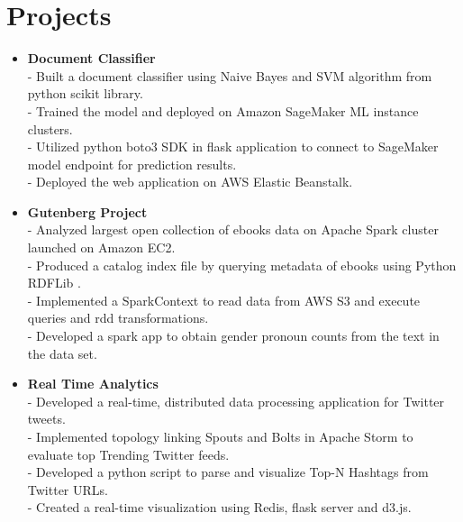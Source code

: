 \section {Projects}
\begin{itemize}



\item \textbf{Document Classifier} \\
 - Built a document classifier using Naive Bayes and SVM algorithm from python scikit library.\\
 - Trained the model and deployed on Amazon SageMaker ML instance clusters.\\
 - Utilized python boto3 SDK in flask application to connect to SageMaker model endpoint for prediction results.\\
 - Deployed the web application on AWS Elastic Beanstalk.

 \item \textbf{Gutenberg Project}\\
 - Analyzed largest open collection of ebooks data on Apache Spark cluster launched on Amazon EC2.\\
 - Produced a catalog index file by querying metadata of ebooks using Python RDFLib .\\
 - Implemented a SparkContext to read data from AWS S3 and execute queries and rdd transformations.\\
 - Developed a spark app to obtain gender pronoun counts from the text in the data set.

\item \textbf{Real Time Analytics} \\
 - Developed a real-time, distributed data processing application for Twitter tweets.\\
 - Implemented topology linking Spouts and Bolts in Apache Storm to evaluate top Trending Twitter feeds. \\
 - Developed a python script to parse and visualize Top-N Hashtags from Twitter URLs.\\
 - Created a real-time visualization using Redis, flask server and d3.js.
 


\end{itemize}
